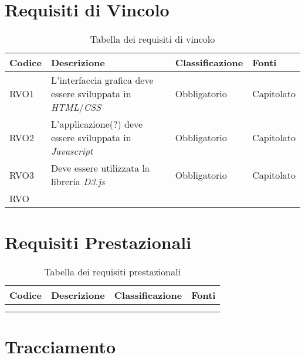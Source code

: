 \section{Requisiti di Vincolo}
\begin{table}[H]
  \centering
  \begin{tabular}{|p{}|p{6cm}|p{3cm}|p{2cm}|}
    \hline
    \rowcolor[HTML]{036400}
    {\color[HTML]{FFFFFF} \textbf{Codice}} & {\color[HTML]{FFFFFF} \textbf{Descrizione}} & {\color[HTML]{FFFFFF} \textbf{Classificazione}} & {\color[HTML]{FFFFFF} \textbf{Fonti}} \\ \hline
    \rowcolor[HTML]{EFEFEF}
    RVO1 & L'interfaccia grafica deve essere sviluppata in \textit{HTML}/\textit{CSS} & Obbligatorio & Capitolato \\ \hline
    \rowcolor[HTML]{C0C0C0}
    RVO2 & L'applicazione(?) deve essere sviluppata in \textit{Javascript} & Obbligatorio & Capitolato \\ \hline
    \rowcolor[HTML]{EFEFEF}
    RVO3 & Deve essere utilizzata la libreria \textit{D3.js} & Obbligatorio & Capitolato \\ \hline
    \rowcolor[HTML]{C0C0C0}
    RVO &  &  &  \\ \hline
  \end{tabular}
  \caption{Tabella dei requisiti di vincolo}
\end{table}

\section{Requisiti Prestazionali}
\begin{table}[H]
  \centering
  \begin{tabular}{|p{}|p{6cm}|p{3cm}|p{2cm}|}
    \hline
    \rowcolor[HTML]{036400}
    {\color[HTML]{FFFFFF} \textbf{Codice}} & {\color[HTML]{FFFFFF} \textbf{Descrizione}} & {\color[HTML]{FFFFFF} \textbf{Classificazione}} & {\color[HTML]{FFFFFF} \textbf{Fonti}} \\ \hline
    \rowcolor[HTML]{EFEFEF}
    &  &  &  \\ \hline
    \rowcolor[HTML]{C0C0C0}
    &  &  &  \\ \hline
  \end{tabular}
  \caption{Tabella dei requisiti prestazionali}
\end{table}

\section{Tracciamento}

